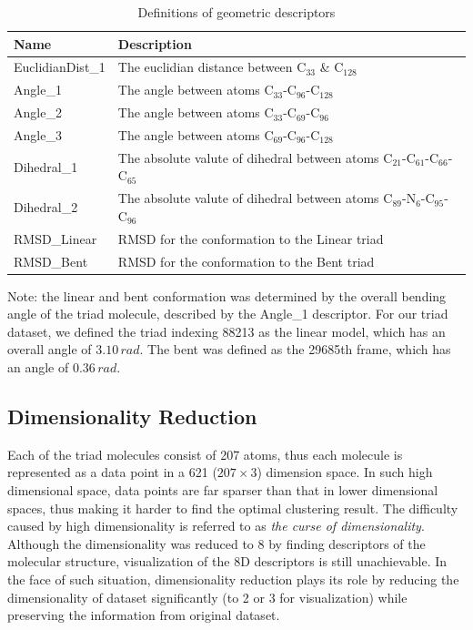 \documentclass[a4paper]{article}
\begin{document}
\begin{table}[H]
    \centering
    \caption{Definitions of geometric descriptors}
    \begin{tabular}{l|l}
    \hline \hline
       \textbf{Name}  & \textbf{Description} \\
       \hline
       EuclidianDist\_1 & The euclidian distance between \(\text{C}_{33}\) \& \(\text{C}_{128}\) \\
       Angle\_1 & The angle between atoms \(\text{C}_{33}\)-\(\text{C}_{96}\)-\(\text{C}_{128}\) \\
       Angle\_2 & The angle between atoms \(\text{C}_{33}\)-\(\text{C}_{69}\)-\(\text{C}_{96}\) \\
       Angle\_3 & The angle between atoms \(\text{C}_{69}\)-\(\text{C}_{96}\)-\(\text{C}_{128}\) \\
       Dihedral\_1 & The absolute valute of dihedral between atoms \(\text{C}_{21}\)-\(\text{C}_{61}\)-\(\text{C}_{66}\)-\(\text{C}_{65}\) \\
       Dihedral\_2 & The absolute valute of dihedral between atoms \(\text{C}_{89}\)-\(\text{N}_{6}\)-\(\text{C}_{95}\)-\(\text{C}_{96}\) \\
       RMSD\_Linear & RMSD for the conformation to the Linear triad \\
       RMSD\_Bent & RMSD for the conformation to the Bent triad \\
       \hline \hline
    \end{tabular}
    
    \label{table: descriptors}
    \vspace{1ex}
    {\noindent \justifying Note: the linear and bent conformation was determined by the overall bending angle of the triad molecule, described by the Angle\_1 descriptor. For our triad dataset, we defined the triad indexing 88213 as the linear model, which has an overall angle of \(3.10\,rad\). The bent was defined as the 29685th frame, which has an angle of \(0.36\,rad\). \par}
\end{table}

\subsection{Dimensionality Reduction}
Each of the triad molecules consist of 207 atoms, thus each molecule is represented as a data point in a 621 (\(207 \times 3\)) dimension space. In such high dimensional space, data points are far sparser than that in lower dimensional spaces, thus making it harder to find the optimal clustering result. The difficulty caused by high dimensionality is referred to as \textit{the curse of dimensionality}\cite{GeronAurelien}. Although the dimensionality was reduced to 8 by finding descriptors of the molecular structure, visualization of the 8D descriptors is still unachievable. In the face of such situation, dimensionality reduction plays its role by reducing the dimensionality of dataset significantly (to 2 or 3 for visualization) while preserving the information from original dataset\cite{GlielmoAldo}.
\end{document}
